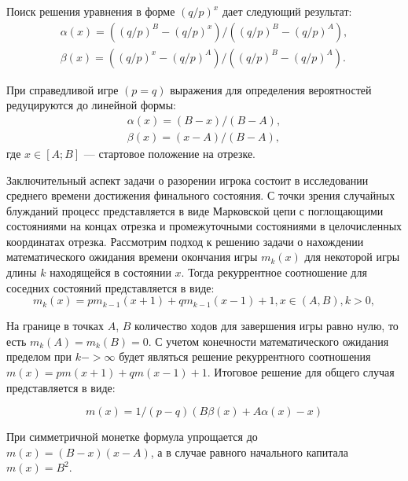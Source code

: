 Поиск решения уравнения в форме $(q/p)^{x}$ дает следующий результат:
\begin{equation}
    \label{eq:eq2}
    \begin{alignedat}{2}
        \alpha(x) = ((q/p)^B-(q/p)^x)/((q/p)^B-(q/p)^A),\\
        \beta(x) = ((q/p)^x-(q/p)^A)/((q/p)^B-(q/p)^A).
    \end{alignedat}
\end{equation}

При справедливой игре $(p=q)$ выражения для определения вероятностей редуцируются до линейной формы:
\begin{equation}
    \label{eq:eq2}
    \begin{alignedat}{2}
        \alpha(x) = (B-x)/(B-A),\\
        \beta(x) = (x-A)/(B-A),
    \end{alignedat}
\end{equation}
где $x \in [A; B]$ --- стартовое положение на отрезке.

Заключительный аспект задачи о разорении игрока состоит в исследовании среднего времени достижения финального состояния.
С точки зрения случайных блужданий процесс представляется в виде Марковской цепи с поглощающими состояниями на концах отрезка 
и промежуточными состояниями в целочисленных координатах отрезка. Рассмотрим подход к решению задачи о нахождении математического
ожидания времени окончания игры $m_k(x)$ для некоторой игры длины $k$ находящейся в состоянии $x$. Тогда рекуррентное соотношение 
для соседних состояний представляется в виде:
\begin{equation}
    \label{eq:eq2}
    m_k(x) = p m_{k-1}(x + 1) + q m_{k-1}(x - 1) + 1, x \in (A, B), k > 0,
\end{equation}

На границе в точках $A$, $B$ количество ходов для завершения игры равно нулю, то есть $m_k(A) = m_k(B) = 0$.
С учетом конечности математического ожидания пределом при $k->\infty$ будет являться решение рекуррентного соотношения 
$m(x)=p m(x+1) +q m(x - 1) + 1$. Итоговое решение для общего случая представляется в виде:

\begin{equation}
    \label{eq:eq2}
    m(x) = 1 / (p - q) (B \beta(x) + A \alpha(x) - x)
\end{equation}

При симметричной монетке формула упрощается до $m(x) = (B - x) (x - A)$, а в случае равного начального капитала $m(x) = B^2$.

